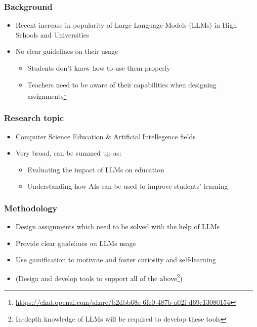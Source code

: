 \begin{contentframe}
    \frametitle{Background}

    \begin{itemize}
        \item Recent increase in popularity of Large Language Models (LLMs) in High Schools and Universities

        \bigskip
        \item No clear guidelines on their usage
        \begin{itemize}
            \item Students don't know how to use them properly
            \item Teachers need to be aware of their capabilities when designing assignments\footnote{\url{https://chat.openai.com/share/b2dbb68e-6fc0-487b-a02f-d69e13080154}}\cite{geng2023can, ouh2023chatgpt}
        \end{itemize}
    \end{itemize}
\end{contentframe}

\begin{contentframe}
    \frametitle{Research topic}

    \begin{itemize}
        \item Computer Science Education \& Artificial Intellegence fields

        \bigskip
        \item Very broad, can be summed up as:
        \begin{itemize}
            \item Evaluating the impact of LLMs on education
            \item Understanding how AIs can be used to improve students' learning
        \end{itemize}
    \end{itemize}
\end{contentframe}

\begin{contentframe}
    \frametitle{Methodology}

    \begin{itemize}
        \item Design assignments which need to be solved with the help of LLMs
        \item Provide clear guidelines on LLMs usage
        \item Use gamification to motivate and foster curiosity and self-learning\cite{elshiekh2017using}
        \bigskip
        \item (Design and develop tools to support all of the above\footnote{In-depth knowledge of LLMs will be required to develop these tools\cite{vaswani2017attention, devlin2018bert}})
    \end{itemize}
\end{contentframe}

